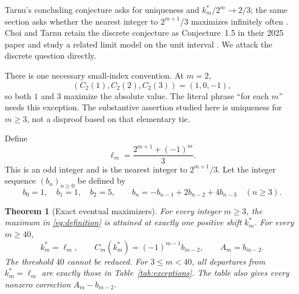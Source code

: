 \documentclass[11pt,a4paper]{article}
\newtheorem{theorem}{Theorem}[section]
\theoremstyle{definition}\newtheorem{definition}[theorem]{Definition}
\theoremstyle{remark}\newtheorem{remark}[theorem]{Remark}
\begin{document}
Tarnu's concluding conjecture asks for uniqueness and
$k_m^*/2^m\to2/3$; the same section asks whether the nearest integer to
$2^{m+1}/3$ maximizes infinitely often \citep[Section~4]{Tarnu2023}.
Choi and Tarnu retain the discrete conjecture as Conjecture~1.5 in their 2025
paper and study a related limit model on the unit interval
\citep[Conjecture~1.5 and Section~4]{ChoiTarnu2025}.
We attack the discrete question directly.

There is one necessary small-index convention. At $m=2$,
\[
 (C_2(1),C_2(2),C_2(3))=(1,0,-1),
\]
so both $1$ and $3$ maximize the absolute value. The literal phrase
``for each $m$'' needs this exception. The substantive assertion studied here
is uniqueness for $m\ge3$, not a disproof based on that elementary tie.

Define
\begin{equation}
 \ell_m=\frac{2^{m+1}+(-1)^m}{3}.
 \label{eq:ell}
\end{equation}
This is an odd integer and is the nearest integer to $2^{m+1}/3$.
Let the integer sequence $(b_n)_{n\ge0}$ be defined by
\begin{equation}
 b_0=1,\quad b_1=1,\quad b_2=5,\qquad
 b_n=-b_{n-1}+2b_{n-2}+4b_{n-3}\quad(n\ge3).
 \label{eq:b-recurrence}
\end{equation}

\begin{theorem}[Exact eventual maximizers]
\label{thm:main}
For every integer $m\ge3$, the maximum in \eqref{eq:definition} is attained
at exactly one positive shift $k_m^*$. For every $m\ge40$,
\begin{equation}
 k_m^*=\ell_m,\qquad
 C_m(k_m^*)=(-1)^{m-1}b_{m-2},\qquad A_m=b_{m-2}.
 \label{eq:main}
\end{equation}
The threshold $40$ cannot be reduced. For $3\le m<40$, all departures from
$k_m^*=\ell_m$ are exactly those in Table~\ref{tab:exceptions}.
The table also gives every nonzero correction $A_m-b_{m-2}$.
\end{theorem}
\end{document}
